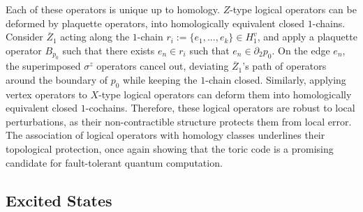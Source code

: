 \documentclass[12pt]{article}
\theoremstyle{definition}
\begin{document}
Each of these operators is unique up to homology. $Z$-type logical operators can be deformed by plaquette operators, into homologically equivalent closed $1$-chains. Consider $\overline{Z}_1$ acting along the $1$-chain $r_i := \{e_1,...,e_k\}\in H^v_1$, and apply a plaquette operator $B_{p_0}$ such that there exists $e_n\in r_i$ such that $e_n\in\partial_2p_0$. On the edge $e_n$, the superimposed $\sigma^z$ operators cancel out, deviating $\overline{Z}_1$'s path of operators around the boundary of $p_0$ while keeping the $1$-chain closed. Similarly, applying vertex operators to $X$-type logical operators can deform them into homologically equivalent closed $1$-cochains. Therefore, these logical operators are robust to local perturbations, as their non-contractible structure protects them from local error. The association of logical operators with homology classes underlines their topological protection, once again showing that the toric code is a promising candidate for fault-tolerant quantum computation.

\subsection{Excited States}
\end{document}
